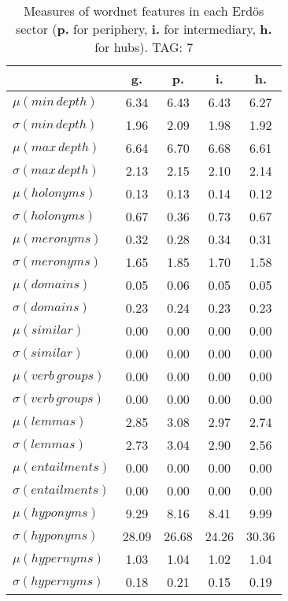 \begin{table}[h!]
\begin{center}
\begin{tabular}{| l || c | c | c | c |}\hline
 & {\bf g.} & {\bf p.} & {\bf i.} & {\bf h.} \\\hline\hline
$\mu(min\,depth)$ & 6.34  & 6.43  & 6.43  & 6.27 \\
$\sigma(min\,depth)$ & 1.96  & 2.09  & 1.98  & 1.92 \\\hline
$\mu(max\,depth)$ & 6.64  & 6.70  & 6.68  & 6.61 \\
$\sigma(max\,depth)$ & 2.13  & 2.15  & 2.10  & 2.14 \\\hline
$\mu(holonyms)$ & 0.13  & 0.13  & 0.14  & 0.12 \\
$\sigma(holonyms)$ & 0.67  & 0.36  & 0.73  & 0.67 \\\hline
$\mu(meronyms)$ & 0.32  & 0.28  & 0.34  & 0.31 \\
$\sigma(meronyms)$ & 1.65  & 1.85  & 1.70  & 1.58 \\\hline
$\mu(domains)$ & 0.05  & 0.06  & 0.05  & 0.05 \\
$\sigma(domains)$ & 0.23  & 0.24  & 0.23  & 0.23 \\\hline
$\mu(similar)$ & 0.00  & 0.00  & 0.00  & 0.00 \\
$\sigma(similar)$ & 0.00  & 0.00  & 0.00  & 0.00 \\\hline
$\mu(verb\,groups)$ & 0.00  & 0.00  & 0.00  & 0.00 \\
$\sigma(verb\,groups)$ & 0.00  & 0.00  & 0.00  & 0.00 \\\hline
$\mu(lemmas)$ & 2.85  & 3.08  & 2.97  & 2.74 \\
$\sigma(lemmas)$ & 2.73  & 3.04  & 2.90  & 2.56 \\\hline
$\mu(entailments)$ & 0.00  & 0.00  & 0.00  & 0.00 \\
$\sigma(entailments)$ & 0.00  & 0.00  & 0.00  & 0.00 \\\hline
$\mu(hyponyms)$ & 9.29  & 8.16  & 8.41  & 9.99 \\
$\sigma(hyponyms)$ & 28.09  & 26.68  & 24.26  & 30.36 \\\hline
$\mu(hypernyms)$ & 1.03  & 1.04  & 1.02  & 1.04 \\
$\sigma(hypernyms)$ & 0.18  & 0.21  & 0.15  & 0.19 \\\hline
\end{tabular}
\caption{Measures of wordnet features in each Erd\"os sector ({{\bf p.}} for periphery, {{\bf i.}} for intermediary, {{\bf h.}} for hubs). TAG: 7}
\end{center}
\end{table}
